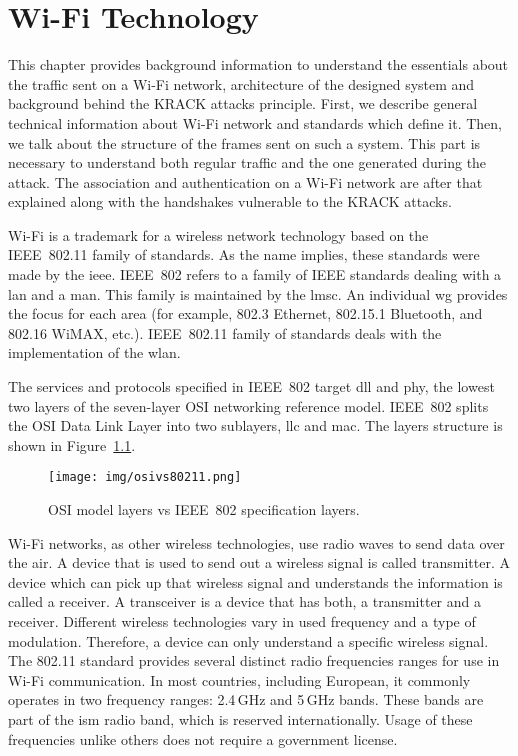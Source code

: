 \chapter{Wi-Fi Technology}
\label{chap:wifi}
This chapter provides background information to understand the essentials about the traffic sent on a Wi-Fi network, architecture of the designed system and background behind the KRACK attacks principle. First, we describe general technical information about Wi-Fi network and standards which define it. Then, we talk about the structure of the frames sent on such a system. This part is necessary to understand both regular traffic and the one generated during the attack. The association and authentication on a Wi-Fi network are after that explained along with the handshakes vulnerable to the KRACK attacks.  

Wi-Fi is a trademark for a wireless network technology based on the IEEE~802.11 family of standards. As the name implies, these standards were made by the \gls{ieee}. IEEE~802 refers to a family of IEEE standards dealing with a \gls{lan} and a \gls{man}. This family is maintained by the \gls{lmsc}. An individual \gls{wg} provides the focus for each area (for example, 802.3 Ethernet, 802.15.1 Bluetooth, and 802.16 WiMAX, etc.). IEEE~802.11 family of standards deals with the implementation of the \gls{wlan}.

The services and protocols specified in IEEE~802 target \gls{dll} and \gls{phy}, the lowest two layers of the seven-layer OSI networking reference model. IEEE~802 splits the OSI Data Link Layer into two sublayers,  \gls{llc} and \gls{mac}. The layers structure is shown in Figure~\ref{fig:layers}.

\begin{figure}[h!]
  \centering
  \texttt{[image: img/osivs80211.png]}
  \caption[OSI model layers vs IEEE~802 specification layers]{OSI model layers vs IEEE~802 specification layers.}
  \label{fig:layers}
\end{figure}

Wi-Fi networks, as other wireless technologies, use radio waves to send data over the air. A device that is used to send out a wireless signal is called transmitter. A device which can pick up that wireless signal and understands the information is called a receiver. A transceiver is a device that has both, a transmitter and a receiver. Different wireless technologies vary in used frequency and a type of modulation. Therefore, a device can only understand a specific wireless signal. The 802.11 standard provides several distinct radio frequencies ranges for use in Wi-Fi communication. In most countries, including European, it commonly operates in two frequency ranges: 2.4\,GHz and 5\,GHz bands. These bands are part of the \gls{ism} radio band, which is reserved internationally. Usage of these frequencies unlike others does not require a government license.

